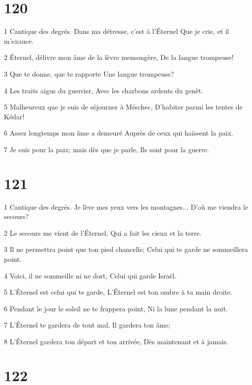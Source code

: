 \chapter{120}

\par 1 Cantique des degrés. Dans ma détresse, c'est à l'Éternel Que je crie, et il m'exauce.
\par 2 Éternel, délivre mon âme de la lèvre mensongère, De la langue trompeuse!
\par 3 Que te donne, que te rapporte Une langue trompeuse?
\par 4 Les traits aigus du guerrier, Avec les charbons ardents du genêt.
\par 5 Malheureux que je suis de séjourner à Méschec, D'habiter parmi les tentes de Kédar!
\par 6 Assez longtemps mon âme a demeuré Auprès de ceux qui haïssent la paix.
\par 7 Je suis pour la paix; mais dès que je parle, Ils sont pour la guerre.

\chapter{121}

\par 1 Cantique des degrés. Je lève mes yeux vers les montagnes... D'où me viendra le secours?
\par 2 Le secours me vient de l'Éternel, Qui a fait les cieux et la terre.
\par 3 Il ne permettra point que ton pied chancelle; Celui qui te garde ne sommeillera point.
\par 4 Voici, il ne sommeille ni ne dort, Celui qui garde Israël.
\par 5 L'Éternel est celui qui te garde, L'Éternel est ton ombre à ta main droite.
\par 6 Pendant le jour le soleil ne te frappera point, Ni la lune pendant la nuit.
\par 7 L'Éternel te gardera de tout mal, Il gardera ton âme;
\par 8 L'Éternel gardera ton départ et ton arrivée, Dès maintenant et à jamais.

\chapter{122}

